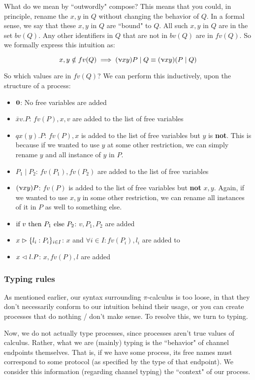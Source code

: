 What do we mean by ``outwordly" compose? This means that you could, in principle, rename the $x,y$ in $Q$ without changing the behavior of $Q$. In a formal sense, we say that these $x,y$ in $Q$ are ``bound" to $Q$. All such $x,y$ in $Q$ are in the set $bv(Q)$. Any other identifiers in $Q$ that are not in $bv(Q)$ are in $fv(Q)$. So we formally express this intuition as:

$$
x,y \notin fv(Q) \implies (\upnu xy)P \mid Q \equiv (\upnu xy)(P \mid Q)
$$


So which values are in $fv(Q)$? We can perform this inductively, upon the structure of a process:

\begin{itemize}
    \item $\textbf{0}$: No free variables are added
    \item $\bar{x}v.P$: $fv(P), x,v$ are added to the list of free variables
    \item $q x(y).P$: $fv(P), x$ is added to the list of free variables but $y$ is \textbf{not}. This is because if we wanted to use $y$ at some other restriction, we can simply rename $y$ and all instance of $y$ in $P$.
    \item $P_1 \mid P_2$: $fv(P_1), fv(P_2)$ are added to the list of free variables
    \item $(\upnu xy)P$: $fv(P)$ is added to the list of free variables but \textbf{not} $x,y$. Again, if we wanted to use $x,y$ in some other restriction, we can rename all instances of it in $P$ as well to something else.
    \item $\text{if } v \text{ then } P_1 \text{ else } P_2$: $v,P_1, P_2$ are added
    \item $x \vartriangleright \{l_i : P_i\}_{i \in I}$: $x$ and $\forall i \in I: fv(P_i), l_i$ are added to
    \item $x \vartriangleleft l.P$: $x, fv(P), l$ are added
\end{itemize}

\subsubsection{Typing rules}
As mentioned earlier, our syntax surrounding $\pi$-calculus is too loose, in that they don't necessarily conform to our intuition behind their usage, or you can create processes that do nothing / don't make sense. To resolve this, we turn to typing.

Now, we do not actually type processes, since processes aren't true values of calculus. Rather, what we are (mainly) typing is the ``behavior" of channel endpoints themselves. That is, if we have some process, its free names must correspond to some protocol (as specified by the type of that endpoint). We consider this information (regarding channel typing) the ``context" of our process.

